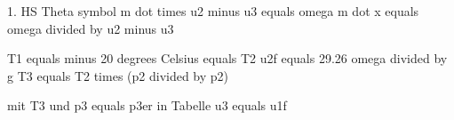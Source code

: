 1. HS
Theta symbol
m dot times u2 minus u3 equals omega
m dot x equals omega divided by u2 minus u3

T1 equals minus 20 degrees Celsius equals T2
u2f equals 29.26 omega divided by g
T3 equals T2 times (p2 divided by p2)

mit T3 und p3 equals p3er
in Tabelle u3 equals u1f